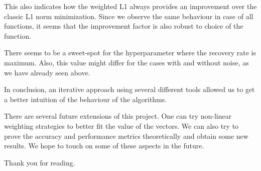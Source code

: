 \documentclass[a4paper,14pt]{article}
\numberwithin{definition}{section}
\numberwithin{mytheorem}{subsection}
\begin{document}
This also indicates how the weighted L1 always provides an improvement over the classic L1 norm minimization. Since we observe the same behaviour in case of all functions, it seems that the improvement factor is also robust to choice of the function.

There seems to be a sweet-spot for the hyperparameter where the recovery rate is maximum. Also, this value might differ for the cases with and without noise, as we have already seen above. 

In conclusion, an iterative approach using several different tools allowed us to get a better intuition of the behaviour of the algorithms.

There are several future extensions of this project. One can try non-linear weighting strategies to better fit the value of the vectors. We can also try to prove the accuracy and performance metrics theoretically and obtain some new results. We hope to touch on some of these aspects in the future.

Thank you for reading.
\end{document}

